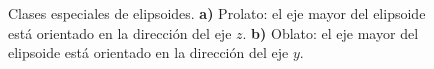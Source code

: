 
\begin{figure}[h!]
	\quad%
	\caption{Clases especiales de elipsoides. \textbf{a)} Prolato: el eje mayor del elipsoide está orientado en la dirección del eje $z$. \textbf{b)} Oblato: el eje mayor del elipsoide está orientado en la dirección del eje $y$.}\label{fig:test}
\end{figure}


